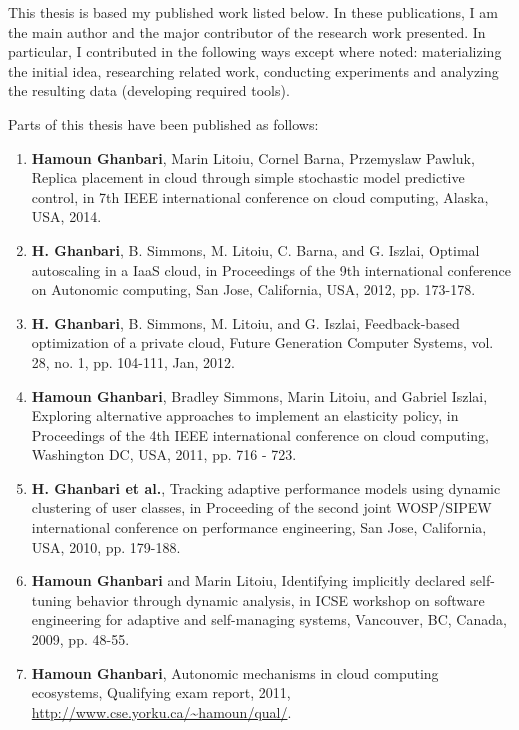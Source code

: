 This thesis is based my published work listed below. In these publications, I am the main author and the major contributor of the research work presented. In particular, I contributed in the following ways except where noted: materializing the initial idea, researching related work, conducting experiments and analyzing the resulting data (developing required tools). 

Parts of this thesis have been published as follows:
\begin{enumerate}
\item \textbf{Hamoun Ghanbari}, Marin Litoiu, Cornel Barna, Przemyslaw Pawluk, Replica placement in cloud through simple stochastic model predictive control, in 7th IEEE international conference on cloud computing, Alaska, USA, 2014. 
\item \textbf{H. Ghanbari}, B. Simmons, M. Litoiu, C. Barna, and G. Iszlai, Optimal autoscaling in a IaaS cloud, in Proceedings of the 9th international conference on Autonomic computing, San Jose, California, USA, 2012, pp. 173-178.
\item \textbf{H. Ghanbari}, B. Simmons, M. Litoiu, and G. Iszlai, Feedback-based optimization of a private cloud, Future Generation Computer Systems, vol. 28, no. 1, pp. 104-111, Jan, 2012.
\item \textbf{Hamoun Ghanbari}, Bradley Simmons, Marin Litoiu, and Gabriel Iszlai, Exploring alternative approaches to implement an elasticity policy, in Proceedings of the 4th IEEE international conference on cloud computing, Washington DC, USA, 2011, pp. 716 - 723. 
\item \textbf{H. Ghanbari et al.}, Tracking adaptive performance models using dynamic clustering of user classes, in Proceeding of the second joint WOSP/SIPEW international conference on performance engineering, San Jose, California, USA, 2010, pp. 179-188.
\item \textbf{Hamoun Ghanbari} and Marin Litoiu, Identifying implicitly declared self-tuning behavior through dynamic analysis, in ICSE workshop on software engineering for adaptive and self-managing systems, Vancouver, BC, Canada, 2009, pp. 48-55.
\item \textbf{Hamoun Ghanbari}, Autonomic mechanisms in cloud computing ecosystems, Qualifying exam report, 2011, \url{http://www.cse.yorku.ca/~hamoun/qual/}. 
\end{enumerate}
